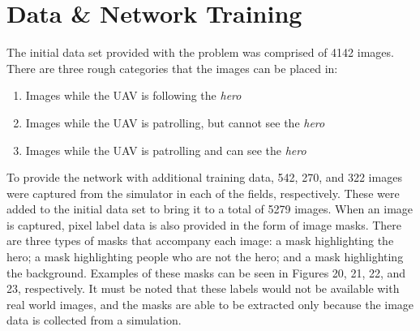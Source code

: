\documentclass[a4paper]{article}
\begin{document}
\section{Data \& Network Training}
The initial data set provided with the problem was comprised of 4142 images. There are three rough categories that the images can be placed in:
\begin{enumerate}
\item Images while the UAV is following the \textit{hero}
\item Images while the UAV is patrolling, but cannot see the \textit{hero}
\item Images while the UAV is patrolling and can see the \textit{hero}
\end{enumerate}
To provide the network with additional training data, 542, 270, and 322 images were captured from the simulator in each of the fields, respectively. These were added to the initial data set to bring it to a total of 5279 images. When an image is captured, pixel label data is also provided in the form of image masks. There are three types of masks that accompany each image: a mask highlighting the hero; a mask highlighting people who are not the hero; and a mask highlighting the background. Examples of these masks can be seen in Figures 20, 21, 22, and 23, respectively. It must be noted that these labels would not be available with real world images, and the masks are able to be extracted only because the image data is collected from a simulation.
\begin{figure}[h]
\begin{minipage}{0.45\textwidth}
\centering
{}
\end{minipage}
\hspace{1cm}
\begin{minipage}{0.45\textwidth}
\centering
{}
\end{minipage}
\end{figure}
\end{document}
